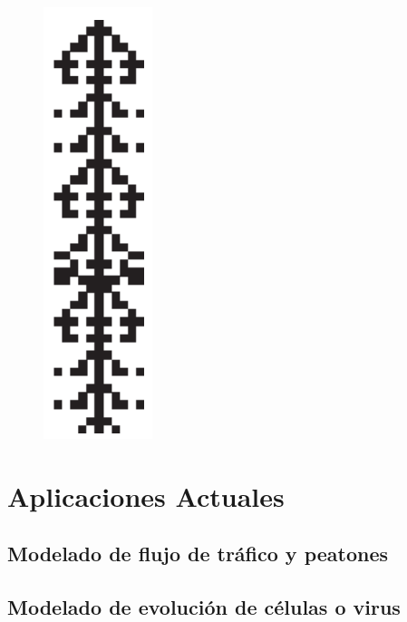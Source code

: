 \begin{figure}[H]
\centering
\includegraphics[scale=0.7]{imagenes/ejemplo_3.png}
\end{figure}



\section{Aplicaciones Actuales} %

\subsection{Modelado de flujo de tráfico y peatones}

\subsection{Modelado de evolución de células o virus}







